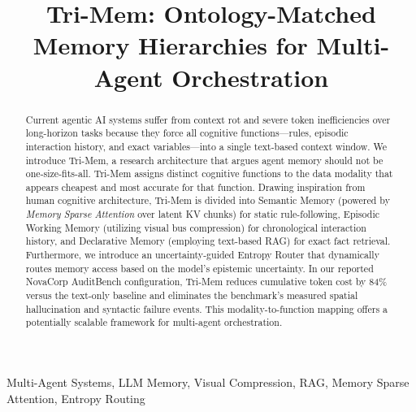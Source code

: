 \documentclass[conference]{IEEEtran}
\begin{document}
\title{Tri-Mem: Ontology-Matched Memory Hierarchies for Multi-Agent Orchestration\\
}

\author{
}

\maketitle

\begin{abstract}
Current agentic AI systems suffer from context rot and severe token inefficiencies over long-horizon tasks because they force all cognitive functions---rules, episodic interaction history, and exact variables---into a single text-based context window. We introduce Tri-Mem, a research architecture that argues agent memory should not be one-size-fits-all. Tri-Mem assigns distinct cognitive functions to the data modality that appears cheapest and most accurate for that function. Drawing inspiration from human cognitive architecture, Tri-Mem is divided into Semantic Memory (powered by \emph{Memory Sparse Attention} over latent KV chunks) for static rule-following, Episodic Working Memory (utilizing visual bus compression) for chronological interaction history, and Declarative Memory (employing text-based RAG) for exact fact retrieval. Furthermore, we introduce an uncertainty-guided Entropy Router that dynamically routes memory access based on the model's epistemic uncertainty. In our reported NovaCorp AuditBench configuration, Tri-Mem reduces cumulative token cost by 84\% versus the text-only baseline and eliminates the benchmark's measured spatial hallucination and syntactic failure events. This modality-to-function mapping offers a potentially scalable framework for multi-agent orchestration.
\end{abstract}

\begin{IEEEkeywords}
Multi-Agent Systems, LLM Memory, Visual Compression, RAG, Memory Sparse Attention, Entropy Routing
\end{IEEEkeywords}
\end{document}
